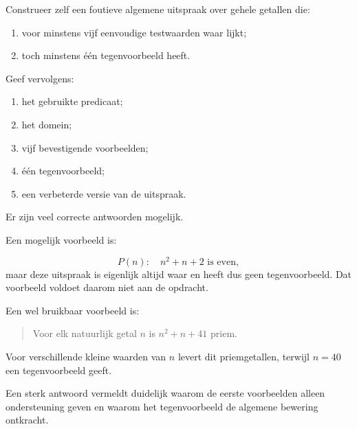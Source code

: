 \documentclass{ximera}
\begin{document}
\begin{oefening}{\oefG}

Construeer zelf een foutieve algemene uitspraak over gehele getallen
die:

\begin{enumerate}
  \item voor minstens vijf eenvoudige testwaarden waar lijkt;
  \item toch minstens één tegenvoorbeeld heeft.
\end{enumerate}

Geef vervolgens:

\begin{enumerate}
  \item het gebruikte predicaat;
  \item het domein;
  \item vijf bevestigende voorbeelden;
  \item één tegenvoorbeeld;
  \item een verbeterde versie van de uitspraak.
\end{enumerate}

\begin{oplossing}
Er zijn veel correcte antwoorden mogelijk.

Een mogelijk voorbeeld is:

\[
P(n):\quad n^2+n+2\text{ is even},
\]
maar deze uitspraak is eigenlijk altijd waar en heeft dus geen
tegenvoorbeeld. Dat voorbeeld voldoet daarom niet aan de opdracht.

Een wel bruikbaar voorbeeld is:

\begin{quote}
Voor elk natuurlijk getal $n$ is $n^2+n+41$ priem.
\end{quote}

Voor verschillende kleine waarden van $n$ levert dit priemgetallen,
terwijl $n=40$ een tegenvoorbeeld geeft.

Een sterk antwoord vermeldt duidelijk waarom de eerste voorbeelden
alleen ondersteuning geven en waarom het tegenvoorbeeld de algemene
bewering ontkracht.
\end{oplossing}

\end{oefening}
\end{document}
